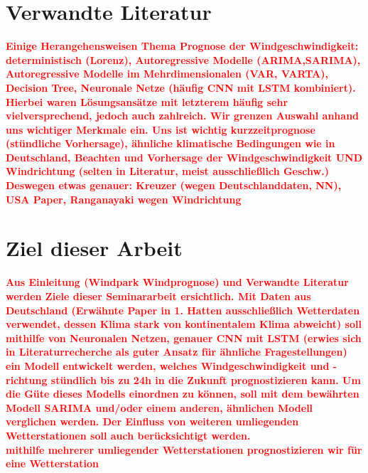 \documentclass[
12pt, %
toc=listofnumbered, %
toc=chapterentrydotfill, %
numbers=noenddot, %
captions=tableheading, %
]{scrreprt}
\let\Oldsection\section
\renewcommand{\section}{\FloatBarrier\Oldsection}
\newcommand{\highlight}[1]{\textbf{\textcolor{red}{#1}}}
\begin{document}
\section{Verwandte Literatur}

\highlight{Einige Herangehensweisen Thema Prognose der Windgeschwindigkeit: 
deterministisch (Lorenz), Autoregressive Modelle (ARIMA,SARIMA), Autoregressive Modelle im Mehrdimensionalen (VAR, VARTA), 
Decision Tree,  Neuronale Netze (häufig CNN mit LSTM kombiniert). 
Hierbei waren Lösungsansätze mit letzterem häufig sehr vielversprechend, jedoch auch zahlreich.
Wir grenzen Auswahl anhand uns wichtiger Merkmale ein. 
Uns ist wichtig kurzzeitprognose (stündliche Vorhersage), ähnliche klimatische Bedingungen wie in Deutschland, Beachten und Vorhersage der Windgeschwindigkeit UND Windrichtung (selten in Literatur, meist ausschließlich Geschw.) 
Deswegen etwas genauer: Kreuzer (wegen Deutschlanddaten, NN), USA Paper, Ranganayaki wegen Windrichtung
}

\section{Ziel dieser Arbeit}

\highlight{Aus Einleitung (Windpark Windprognose) und Verwandte Literatur werden Ziele dieser Seminararbeit ersichtlich. 
Mit Daten aus Deutschland (Erwähnte Paper in 1. Hatten ausschließlich Wetterdaten verwendet, dessen Klima stark von kontinentalem Klima abweicht) 
soll mithilfe von Neuronalen Netzen, genauer CNN mit LSTM (erwies sich in Literaturrecherche als guter Ansatz für ähnliche Fragestellungen) ein 
Modell entwickelt werden, welches Windgeschwindigkeit und -richtung stündlich bis zu 24h in die Zukunft prognostizieren kann. 
Um die Güte dieses Modells einordnen zu können, soll mit dem bewährten Modell SARIMA und/oder einem anderen, ähnlichen Modell verglichen werden. 
Der Einfluss von weiteren umliegenden Wetterstationen soll auch berücksichtigt werden.} \\

\highlight{mithilfe mehrerer umliegender Wetterstationen prognostizieren wir für eine Wetterstation}

\end{document}
